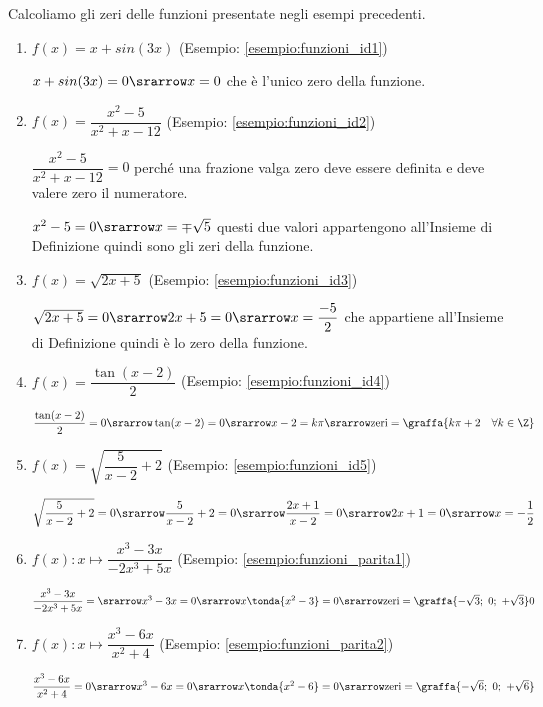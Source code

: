 \begin{esempio}
Calcoliamo gli zeri delle funzioni presentate negli esempi precedenti.
\begin{enumerate}
\item \(f(x) = x +sin(3x)\) \quad (Esempio: \ref{esempio:funzioni_id1})

\(x +sin(3x) = 0 \srarrow x = 0\) che è l'unico zero della funzione.

\item \(f(x) = \dfrac{x^2 -5}{x^2 +x -12}\) \quad 
(Esempio: \ref{esempio:funzioni_id2})

\(\dfrac{x^2 -5}{x^2 +x -12} = 0\) perché una frazione valga zero deve 
essere definita e deve valere zero il numeratore.

\(x^2 -5 = 0 \srarrow x = \mp \sqrt{5}\)
questi due valori appartengono all'Insieme di Definizione quindi sono gli 
zeri della funzione.

\item \(f(x) = \sqrt{2x +5}\) \quad 
(Esempio: \ref{esempio:funzioni_id3}) 

\(\sqrt{2x +5} = 0 \srarrow 2x +5 = 0 \srarrow x = \dfrac{-5}{2}\)
che appartiene all'Insieme di Definizione quindi è lo zero della funzione.

\item \(f(x) = \dfrac{\tan(x -2)}{2}\) \quad 
(Esempio: \ref{esempio:funzioni_id4}) 

\(\dfrac{\tan(x -2)}{2} = 0 \srarrow \tan(x -2) = 0 \srarrow 
  x -2 = k \pi \srarrow 
  \text{zeri} = \graffa{k \pi +2 \quad \forall k \in \Z}\) 

\item \(f(x) = \sqrt{\dfrac{5}{x-2}+2}\) \quad 
(Esempio: \ref{esempio:funzioni_id5})

\(\sqrt{\dfrac{5}{x-2}+2} = 0 \srarrow \dfrac{5}{x-2}+2 = 0 \srarrow
\dfrac{2x +1}{x-2} = 0 \srarrow 2x +1 = 0 \srarrow x = -\dfrac{1}{2}\)

\item  \quad \(f(x): x \mapsto \dfrac{x^3 -3x}{-2x^3+5x}\)
(Esempio: \ref{esempio:funzioni_parita1})

\(\dfrac{x^3 -3x}{-2x^3+5x} = \srarrow x^3 -3x = 0 \srarrow 
  x\tonda{x^2 -3} = 0 \srarrow 
\text{zeri} = \graffa{-\sqrt{3};~0;~+\sqrt{3}}0\)

\item  \quad \(f(x): x \mapsto \dfrac{x^3 -6x}{x^2+4}\)
(Esempio: \ref{esempio:funzioni_parita2})

\(\dfrac{x^3 -6x}{x^2+4} = 0 \srarrow x^3 -6x = 0 \srarrow 
  x\tonda{x^2 -6} = 0 \srarrow 
\text{zeri} = \graffa{-\sqrt{6};~0;~+\sqrt{6}}\)


\end{enumerate}
\end{esempio}
